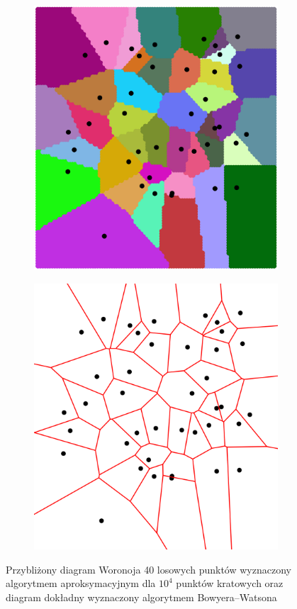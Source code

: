 \documentclass{myclass}
\begin{document}
\begin{figure}[ht]
    \centering
    \hfil
    \begin{subfigure}[b]{0.45\textwidth}
        \centering
        \includegraphics[width=\textwidth]{figs/approx.png}
    \end{subfigure}
    \hfil
    \begin{subfigure}[b]{0.45\textwidth}
        \centering
        \includegraphics[width=\textwidth]{figs/approx1.png}
    \end{subfigure}
    
    \caption{Przybliżony diagram Woronoja 40 losowych punktów wyznaczony algorytmem aproksymacyjnym dla \(10^4\) punktów kratowych oraz diagram dokładny wyznaczony algorytmem Bowyera--Watsona}
    \label{fig3}

\end{figure}
\end{document}
